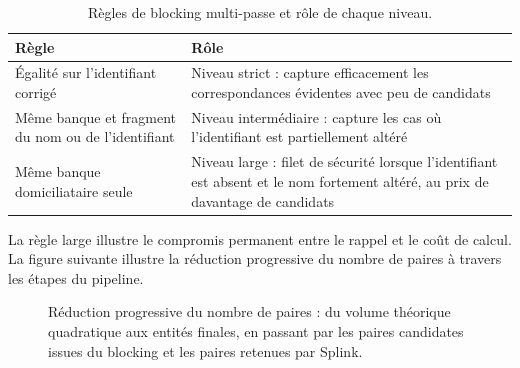 \begin{table}[H]
\centering
\caption{Règles de blocking multi-passe et rôle de chaque niveau.}
\renewcommand{\arraystretch}{1.3}
\setlength{\tabcolsep}{3pt}
{\small
\begin{tabular}{|p{5.5cm}|p{8.1cm}|}
\hline
\textbf{Règle} & \textbf{Rôle} \\
\hline
Égalité sur l'identifiant corrigé & Niveau strict : capture efficacement les correspondances évidentes avec peu de candidats \\
\hline
Même banque et fragment du nom ou de l'identifiant & Niveau intermédiaire : capture les cas où l'identifiant est partiellement altéré \\
\hline
Même banque domiciliataire seule & Niveau large : filet de sécurité lorsque l'identifiant est absent et le nom fortement altéré, au prix de davantage de candidats \\
\hline
\end{tabular}
}
\end{table}

\noindent La règle large illustre le compromis permanent entre le rappel et le coût de calcul. La figure suivante illustre la réduction progressive du nombre de paires à travers les étapes du pipeline.

\begin{figure}[H]
\centering
{}
\caption{Réduction progressive du nombre de paires : du volume théorique quadratique aux entités finales, en passant par les paires candidates issues du blocking et les paires retenues par Splink.}
\label{fig:blocking-impact}
\end{figure}

